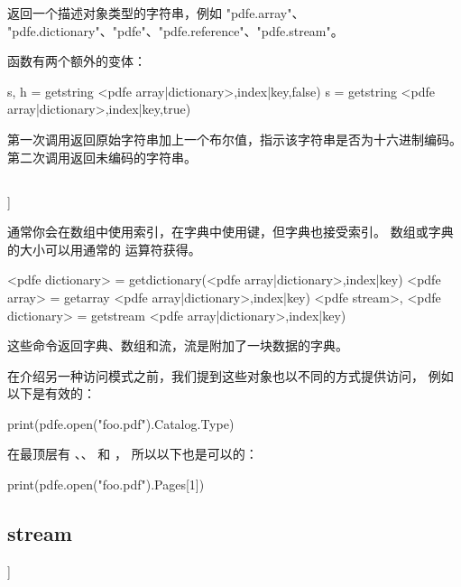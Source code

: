  返回一个描述对象类型的字符串，例如 "pdfe.array"、
"pdfe.dictionary"、"pdfe"、"pdfe.reference"、"pdfe.stream"。

 函数有两个额外的变体：

\begin{typing}
s, h = getstring <pdfe array|dictionary>,index|key,false)
s    = getstring <pdfe array|dictionary>,index|key,true)
\end{typing}

第一次调用返回原始字符串加上一个布尔值，指示该字符串是否为十六进制编码。
第二次调用返回未编码的字符串。

\subsection{{\type {get[from}}}]

 
      
     

通常你会在数组中使用索引，在字典中使用键，但字典也接受索引。
数组或字典的大小可以用通常的 \type {#} 运算符获得。

\begin{typing}
<pdfe dictionary>   = getdictionary(<pdfe array|dictionary>,index|key)
<pdfe array>        = getarray     <pdfe array|dictionary>,index|key)
<pdfe stream>,
<pdfe dictionary>   = getstream    <pdfe array|dictionary>,index|key)
\end{typing}

这些命令返回字典、数组和流，流是附加了一块数据的字典。

在介绍另一种访问模式之前，我们提到这些对象也以不同的方式提供访问，
例如以下是有效的：

\begin{typing}
print(pdfe.open("foo.pdf").Catalog.Type)
\end{typing}

在最顶层有 、、 和 ，
所以以下也是可以的：

\begin{typing}
print(pdfe.open("foo.pdf").Pages[1])
\end{typing}

\subsection{{\type {[open|close|readfrom|whole|}stream}}]

